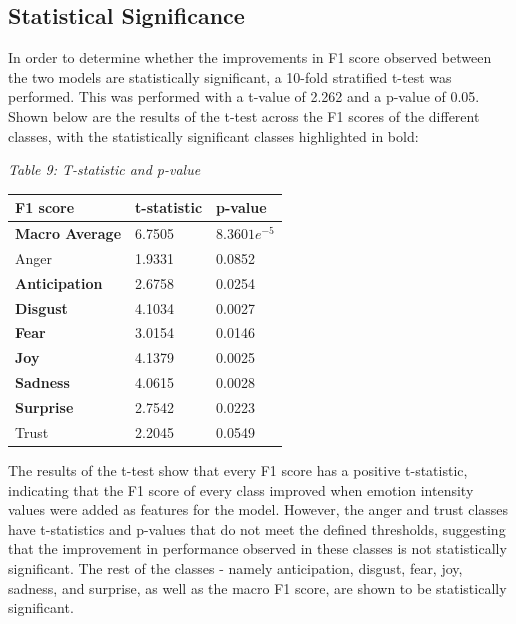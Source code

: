 \documentclass[journal]{./IEEE/IEEEtran}
\begin{document}
\subsection{Statistical Significance}

In order to determine whether the improvements in F1 score observed between the two models are statistically significant, a 10-fold stratified t-test was performed. This was performed with a t-value of 2.262 and a p-value of 0.05. Shown below are the results of the t-test across the F1 scores of the different classes, with the statistically significant classes highlighted in bold:

\begin{table}[h!]
    \centering
    \emph{Table 9: T-statistic and p-value}\\
    \begin{tabular}{|l|l|l|}
        \hline
        F1 score     & t-statistic & p-value        \\ \hline
        \textbf{Macro Average}     & 6.7505      & $8.3601e^{-5}$ \\ \hline
        Anger        & 1.9331      & 0.0852         \\ \hline
        \textbf{Anticipation} & 2.6758      & 0.0254         \\ \hline
        \textbf{Disgust}      & 4.1034      & 0.0027         \\ \hline
        \textbf{Fear}         & 3.0154      & 0.0146         \\ \hline
        \textbf{Joy}          & 4.1379      & 0.0025         \\ \hline
        \textbf{Sadness}      & 4.0615      & 0.0028         \\ \hline
        \textbf{Surprise}     & 2.7542      & 0.0223         \\ \hline
        Trust        & 2.2045      & 0.0549         \\ \hline
    \end{tabular}%
\end{table}

The results of the t-test show that every F1 score has a positive t-statistic, indicating that the F1 score of every class improved when emotion intensity values were added as features for the model. However, the anger and trust classes have t-statistics and p-values that do not meet the defined thresholds, suggesting that the improvement in performance observed in these classes is not statistically significant. The rest of the classes - namely anticipation, disgust, fear, joy, sadness, and surprise, as well as the macro F1 score, are shown to be statistically significant.
\end{document}
